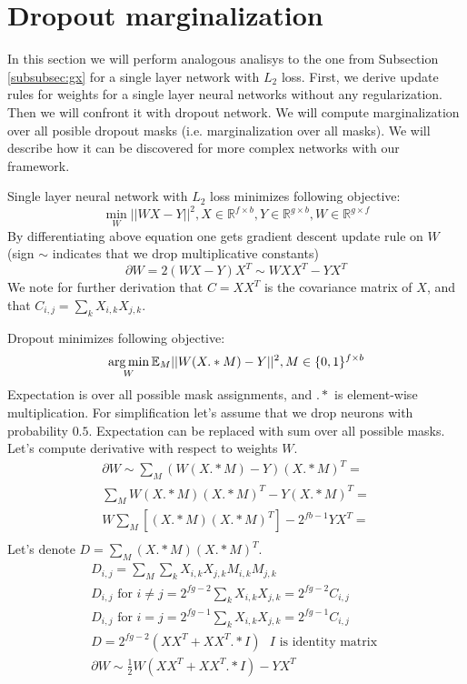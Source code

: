 \section{Dropout marginalization}
In this section we will perform analogous analisys to the one from Subsection \ref{subsubsec:gx} 
for a single layer network with $L_2$ loss. 
First, we derive update rules for weights for a single layer neural networks without any regularization. Then
we will confront it with dropout network. We will compute marginalization over
all posible dropout masks (i.e. marginalization over all masks).
We will describe how it can be discovered for
more complex networks with our framework. 


Single layer neural network with $L_2$ loss minimizes following objective:
\begin{equation*}
  \min_W ||WX - Y||^2, X \in \mathbb{R}^{f \times b}, Y \in \mathbb{R}^{g \times b}, W \in \mathbb{R}^{g \times f}
\end{equation*}
By differentiating above equation one gets gradient descent update rule
on $W$ (sign $\sim$ indicates that we drop multiplicative constants)
\begin{equation*}
 \partial W = 2(WX - Y)X^T \sim WXX^T - YX^T
\end{equation*}
We note for further derivation that $C = XX^T$ is the covariance matrix of
$X$, and that $C_{i,j} = \sum_k X_{i, k}X_{j, k}$.


Dropout minimizes following objective:
\begin{equation*}
  \operatorname*{arg\,min}_W \mathbb{E}_M ||W(X .* M) - Y||^2, M \in \{0, 1\}^{f \times b}
\end{equation*}
Expectation is over all possible mask assignments, and $.*$ is 
element-wise multiplication. For simplification
let's assume that we drop neurons with probability $0.5$. Expectation
can be replaced with sum over all possible masks. Let's compute
derivative with respect to weights $W$. 
\begin{align*}
  \partial W \sim \sum_M (W(X .* M) - Y)(X .* M)^T = \\
  \sum_M W(X .* M)(X .* M)^T - Y(X .* M)^T = \\
  W\sum_M [(X .* M)(X .* M)^T] - 2^{fb - 1}YX^T= \\
\end{align*}
Let's denote $D = \sum_M (X .* M)(X .* M)^T$. 
\begin{align*}
  D_{i,j} = \sum_M \sum_k X_{i, k} X_{j, k} M_{i, k} M_{j, k} \\
  D_{i,j} \text{ for } i \neq j = 2^{fg - 2} \sum_k X_{i, k} X_{j, k} = 2^{fg - 2}C_{i, j} \\
  D_{i,j} \text{ for } i = j = 2^{fg - 1} \sum_k X_{i, k} X_{j, k} = 2^{fg - 1}C_{i, j} \\
  D = 2^{fg - 2}(XX^T + XX^T .* I) \text { $I$ is identity matrix } \\
  \partial W \sim \frac{1}{2}W (XX^T + XX^T .* I) - YX^T
\end{align*}

